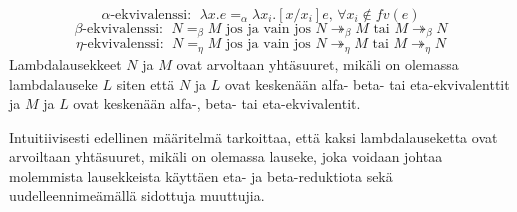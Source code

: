 \begin{maar}
		 
\[ 
	\alpha \text{-ekvivalenssi: } \; \lambda x.e =_{\alpha} \lambda x_{i}.		[x/x_{i}]e \text{,  } \forall x_{i} \notin fv(e) 
\]
\[ 
	\beta \text{-ekvivalenssi: } \; N =_{\beta} M \text{ jos ja vain jos } N 		\twoheadrightarrow_{\beta} M \text{ tai }
	M \twoheadrightarrow_{\beta} N 
\]
\[ 
	\eta \text{-ekvivalenssi: } \; N =_{\eta} M \text{ jos ja vain jos } N 		\twoheadrightarrow_{\eta} M \text{ tai }
	M \twoheadrightarrow_{\eta} N 
\]
Lambdalausekkeet $N$ ja $M$ ovat arvoltaan yhtäsuuret, mikäli	on olemassa lambdalauseke $L$ siten että $N$ ja $L$ ovat keskenään alfa- beta- tai eta-ekvivalenttit ja $M$ ja $L$ ovat keskenään alfa-, beta- tai eta-ekvivalentit.	
\end{maar}

Intuitiivisesti edellinen määritelmä tarkoittaa, että kaksi lambdalauseketta ovat arvoiltaan yhtäsuuret, mikäli on olemassa lauseke, joka voidaan johtaa molemmista lausekkeista käyttäen eta- ja beta-reduktiota sekä uudelleennimeämällä sidottuja muuttujia. 


 
 


